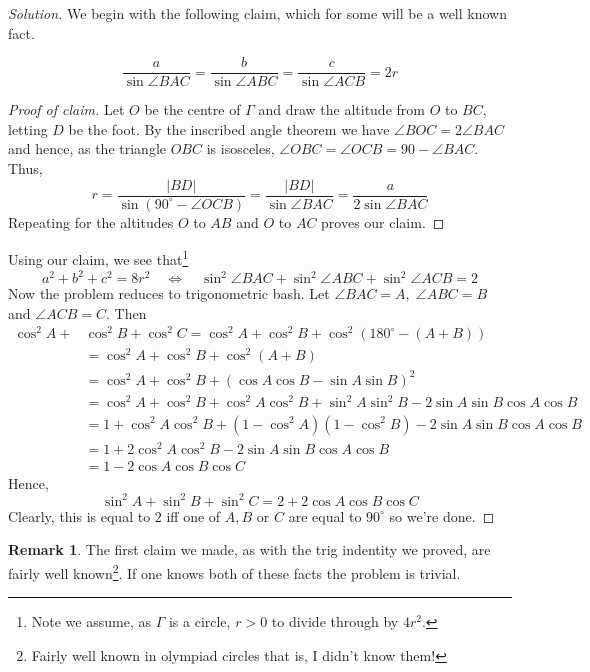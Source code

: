 \documentclass[11pt]{article}
\theoremstyle{definition}
\newtheorem*{remark}{Remark}
\begin{document}
\begin{proof}[Solution]
  We begin with the following claim, which for some will be a well known fact. 
  \begin{claim}
    \[\frac{a}{\sin \angle BAC} = \frac{b}{\sin \angle ABC} = \frac{c}{\sin \angle ACB} = 2r\]
  \end{claim}
  \begin{proof}[Proof of claim]
    Let $O$ be the centre of $\Gamma$ and draw the altitude from $O$ to $BC$, letting $D$ be the foot. By the 
    inscribed angle theorem we have $\angle BOC = 2\angle BAC$ and hence, as the triangle $OBC$ is isosceles, 
    $\angle OBC = \angle OCB = 90 - \angle BAC$. Thus, 
    \[r = \frac{|BD|}{\sin \left(90^\circ - \angle OCB\right)} = \frac{|BD|}{\sin \angle BAC} = \frac{a}{2\sin \angle BAC}\]
    Repeating for the altitudes $O$ to $AB$ and $O$ to $AC$ proves our claim.
  \end{proof}
  Using our claim, we see that\footnote{Note we assume, as $\Gamma$ is a circle, $r > 0$ to divide through by $4r^2$.}
  \[a^2 + b^2 + c^2 = 8r^2 \quad \Longleftrightarrow \quad \sin^2 \angle BAC + \sin^2 \angle ABC + \sin^2 \angle ACB = 2\]
  Now the problem reduces to trigonometric bash. Let $\angle BAC = A, \; \angle ABC = B$ and $\angle ACB = C$. Then 
    \begin{align*}
      \cos^2 A + &\cos^2 B + \cos^2 C = \cos^2 A + \cos^2 B + \cos^2 (180^\circ - (A+B)) \\ 
      &= \cos^2 A + \cos^2 B + \cos^2 (A+B) \\ 
      &= \cos^2 A + \cos^2 B + (\cos A \cos B - \sin A \sin B)^2  \\ 
      &= \cos^2 A + \cos^2 B + \cos^2 A \cos^2 B + \sin^2 A \sin^2 B - 2\sin A \sin B \cos A \cos B \\
      &= 1 + \cos^2 A \cos^2 B + (1 - \cos^2 A)(1 - \cos^2 B) - 2\sin A \sin B \cos A \cos B \\ 
      &= 1 + 2\cos^2 A \cos^2 B - 2\sin A \sin B \cos A \cos B \\ 
      &= 1 - 2\cos A \cos B \cos C
    \end{align*} 
  Hence, 
  \[\sin^2 A + \sin ^2 B + \sin^2 C = 2 + 2\cos A \cos B \cos C\]
  Clearly, this is equal to $2$ iff one of $A, B$ or $C$ are equal to $90^\circ$ so we're done.
\end{proof} 

\begin{remark}
  The first claim we made, as with the trig indentity we proved, are fairly well known\footnote{
    Fairly well known in olympiad circles that is, I didn't know them!
  }. If one knows both of these 
  facts the problem is trivial. 
\end{remark}
\end{document}
